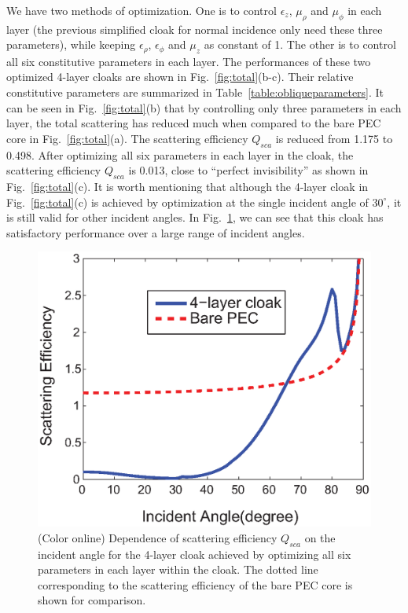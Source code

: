 \documentclass[12pt]{article} %
\begin{document}
We have two methods of optimization. One is to control $\epsilon_z$,
$\mu_\rho$ and $\mu_\phi$ in each layer (the previous simplified
cloak for normal incidence only need these three parameters), while
keeping $\epsilon_\rho$, $\epsilon_\phi$ and $\mu_z$ as constant of
1. The other is to control all six constitutive parameters in each
layer. The performances of these two optimized 4-layer cloaks are
shown in Fig.~\ref{fig:total}(b-c). Their relative constitutive
parameters are summarized in Table~\ref{table:obliqueparameters}. It
can be seen in Fig.~\ref{fig:total}(b) that by controlling only
three parameters in each layer, the total scattering has reduced
much when compared to the bare PEC core in Fig.~\ref{fig:total}(a).
The scattering efficiency $Q_{sca}$ is reduced from 1.175 to 0.498.
After optimizing all six parameters in each layer in the cloak, the
scattering efficiency $Q_{sca}$ is 0.013, close to ``perfect
invisibility'' as shown in Fig.~\ref{fig:total}(c). It is worth
mentioning that although the 4-layer cloak in
Fig.~\ref{fig:total}(c) is achieved by optimization at the single
incident angle of $30^\circ$, it is still valid for other incident
angles. In Fig.~\ref{fig:RCSoblique}, we can see that this cloak has
satisfactory performance over a large range of incident angles.

\begin{figure}
\centering
\includegraphics[width=0.5\columnwidth,draft=false]{Fig_3}%
\caption{\label{fig:RCSoblique} (Color online) Dependence of
scattering efficiency $Q_{sca}$ on the incident angle for the
4-layer cloak achieved by optimizing all six parameters in each
layer within the cloak. The dotted line corresponding to the
scattering efficiency of the bare PEC core is shown for comparison.}
\end{figure}
\end{document}
